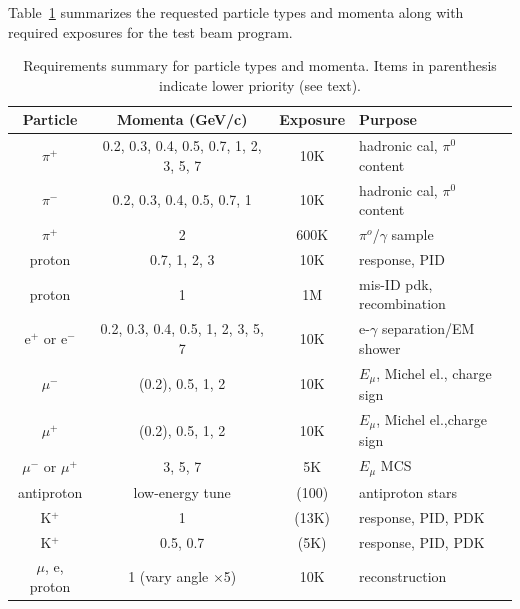 Table~\ref{tab:runsum} summarizes the requested particle types and momenta along with 
required exposures for the test beam program.
\begin{table}[h]
\centering
\begin{tabular}{|c|c|c|l|}
\hline
Particle & Momenta (GeV/c) & Exposure & Purpose \\ \hline
$\pi^+$       & 0.2, 0.3, 0.4, 0.5, 0.7, 1, 2, 3, 5, 7     &  10K  & hadronic cal, $\pi^0$ content \\ \hline
$\pi^-$       &  0.2, 0.3, 0.4, 0.5, 0.7, 1     &  10K  & hadronic cal, $\pi^0$ content \\ \hline
$\pi^+$   &  2  &  600K & $\pi^o$/$\gamma$ sample \\ \hline
proton &  0.7, 1, 2, 3   &  10K & response, PID \\ \hline
proton &  1   &  1M & mis-ID pdk, recombination \\ \hline
e$^+$ or e$^-$       &    0.2, 0.3, 0.4, 0.5, 1, 2, 3, 5, 7        &    10K   & e-$\gamma$ separation/EM shower     \\ \hline
$\mu^-$  &   (0.2), 0.5, 1, 2  &  10K & $E_\mu$, Michel el., charge sign \\ \hline
$\mu^+$ &   (0.2), 0.5, 1, 2   &  10K & $E_\mu$, Michel el.,charge sign  \\ \hline
$\mu^-$ or $\mu^+$ &   3, 5, 7  &  5K & $E_\mu$ MCS \\ \hline
antiproton &  low-energy tune  &  (100) & antiproton stars \\ \hline
K$^+$  & 1 & (13K)   &   response, PID, PDK  \\ \hline
K$^+$  & 0.5, 0.7 & (5K)   &   response, PID, PDK  \\ \hline \hline
$\mu$, e, proton  & 1 (vary angle $\times$5) & 10K  & reconstruction  \\ \hline
\end{tabular}
\caption{Requirements summary for particle types and momenta. Items in parenthesis indicate lower priority (see text).
}
\label{tab:runsum}
\end{table}


